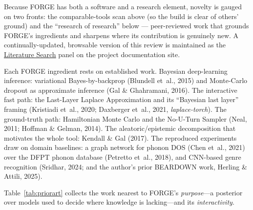 \documentclass[11pt]{article}
\newcommand{\urllink}[2]{\href{#1}{\textcolor{urlblue}{\underline{#2}}}}
\begin{document}
Because FORGE has both a software and a research element, novelty is gauged on two fronts: the comparable-tools scan above (so the build is clear of others' ground) and the ``research of research'' below --- peer-reviewed work that grounds FORGE's ingredients and sharpens where its contribution is genuinely new. A continually-updated, browsable version of this review is maintained as the \urllink{https://n-herling-mk1.github.io/INFO_698_documentation/index.html\#literature}{Literature Search} panel on the project documentation site.

Each FORGE ingredient rests on established work. Bayesian deep-learning inference: variational Bayes-by-backprop (Blundell et~al., 2015) and Monte-Carlo dropout as approximate inference (Gal \& Ghahramani, 2016). The interactive fast path: the Last-Layer Laplace Approximation and its ``Bayesian last layer'' framing (Kristiadi et~al., 2020; Daxberger et~al., 2021, \emph{laplace-torch}). The ground-truth path: Hamiltonian Monte Carlo and the No-U-Turn Sampler (Neal, 2011; Hoffman \& Gelman, 2014). The aleatoric/epistemic decomposition that motivates the whole tool: Kendall \& Gal (2017). The reproduced experiments draw on domain baselines: a graph network for phonon DOS (Chen et~al., 2021) over the DFPT phonon database (Petretto et~al., 2018), and CNN-based genre recognition (Sridhar, 2024; and the author's prior BEARDOWN work, Herling \& Attili, 2025).

Table~\ref{tab:priorart} collects the work nearest to FORGE's \emph{purpose}---a posterior over models used to decide where knowledge is lacking---and its \emph{interactivity}.
\end{document}
